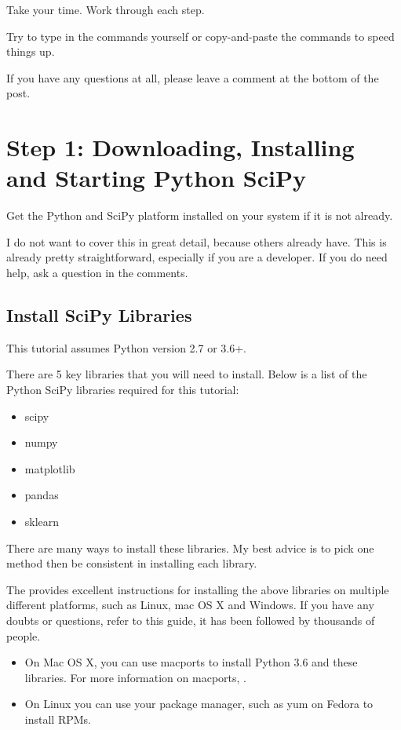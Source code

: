 Take your time. Work through each step.
    
Try to type in the commands yourself or copy-and-paste the commands to speed things up.
    
If you have any questions at all, please leave a comment at the bottom of the post.

\section{Step 1: Downloading, Installing and Starting Python SciPy}

Get the Python and SciPy platform installed on your system if it is not already.

I do not want to cover this in great detail, because others already have. This is already pretty straightforward, especially if you are a developer. If you do need help, ask a question in the comments.



\subsection{Install SciPy Libraries}

This tutorial assumes Python version 2.7 or 3.6+.

There are 5 key libraries that you will need to install. Below is a list of the Python SciPy libraries required for this tutorial:

\begin{itemize}
  \item scipy
  \item numpy
  \item matplotlib
  \item pandas
  \item sklearn
\end{itemize}

There are many ways to install these libraries. My best advice is to pick one method then be consistent in installing each library.

The  provides excellent instructions for installing the above libraries on multiple different platforms, such as Linux, mac OS X and Windows. If you have any doubts or questions, refer to this guide, it has been followed by thousands of people.

\begin{itemize}
  \item On Mac OS X, you can use macports to install Python 3.6 and these libraries. For more information on macports, .
  \item On Linux you can use your package manager, such as yum on Fedora to install RPMs.
\end{itemize}

